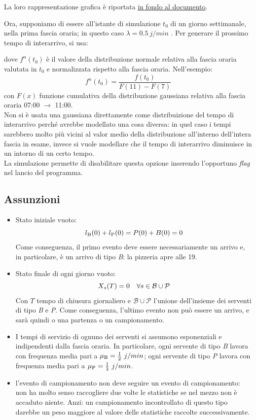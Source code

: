 \documentclass[a4paper, 12pt]{article}
\newcommand{\key}[1]{\texttt{\StrSubstitute{#1}{_}{\_}}}
\begin{document}
La loro rappresentazione grafica è riportata \hyperlink{rappresentazione grafica gaussiane}{in fondo al documento}. 
\bigskip

Ora, supponiamo di essere all'istante di simulazione $t_0$ di un giorno settimanale, nella prima fascia oraria; in questo caso $\lambda = 0.5\ j/min$ .  Per generare il prossimo tempo di interarrivo, si usa:
\begin{center}
\key{Exponential(1/$\lambda$) * $f^n(t0)$}
\end{center}
dove $f^n(t_0)$ è il valore della distribuzione normale relativa alla fascia oraria valutata in $t_0$ e normalizzata rispetto alla fascia oraria. Nell'esempio:
\[
f^n(t_0) = \frac{f(t_0)}{F(11) - F(7)}
\]
con $F(x)$ funzione cumulativa della distribuzione gaussiana relativa alla fascia oraria 07:00 $\rightarrow$ 11:00.\\

Non si è usata una gaussiana direttamente come distribuizione del tempo di interarrivo perché avrebbe modellato una cosa diversa: in quel caso i tempi sarebbero molto più vicini al valor medio della distribuzione all'interno dell'intera fascia in esame, invece si vuole modellare che il tempo di interarrivo diminuisce in un intorno di un certo tempo. \\

La simulazione permette di disabilitare questa opzione inserendo l'opportuno \textit{flag} nel lancio del programma.


\subsection{Assunzioni}
\begin{itemize}
  \item Stato iniziale vuoto: 
  \[ 
    l\textsubscript{B}(0) + l\textsubscript{P}(0) = P(0) + B(0) = 0 
\]
  Come conseguenza, il primo evento deve essere necessariamente un arrivo e, in particolare, è un arrivo di tipo \textit{B}: la pizzeria apre alle 19.
  \item Stato finale di ogni giorno vuoto:
\[
    X\textsubscript{s}(T) = 0\ \ \ \forall s \in \mathcal{B} \cup \mathcal{P}
\]
  Con $T$ tempo di chiusura giornaliero e $\mathcal{B} \cup \mathcal{P}$ l'unione dell'insieme dei serventi di tipo \textit{B} e \textit{P}. Come conseguenza, l'ultimo evento non può essere un arrivo, e sarà quindi o una partenza o un campionamento.

  \item I tempi di servizio di ognuno dei serventi si assumono  esponenziali e indipendenti dalla fascia oraria. In particolare, ogni servente di tipo \textit{B} lavora con frequenza media pari a $\mu\textsubscript{B} = \frac{1}{2}\ j/min$; ogni servente di tipo \textit{P} lavora con frequenza media pari a $\mu\textsubscript{P} = \frac{1}{3}\ j/min$. 
  
\item l'evento di campionamento non deve seguire un evento di campionamento: non ha molto senso raccogliere due volte le statistiche se nel mezzo non è accaduto niente. Anzi: un campionamento incontrollato di questo tipo darebbe un peso maggiore al valore delle statistiche raccolte successivamente.
\end{itemize}
\end{document}
